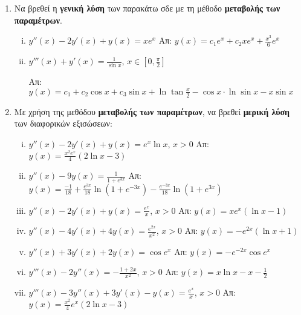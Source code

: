 \documentclass[a4paper,table]{report}
\begin{document}
\begin{enumerate}
  \item Να βρεθεί η \textbf{γενική λύση} των παρακάτω σδε με τη μέθοδο 
    \textbf{μεταβολής των παραμέτρων}.
    \begin{enumerate}[i)]
      \item $y''(x)-2y'(x)+y(x)=xe^{x}$ 
        \hfill Απ: $y(x)=c_{1}e^{x}+c_{2}xe^{x}+\frac{x^{3}}{6}e^{x}$
      \item $y'''(x)+y'(x)=\frac{1}{\sin x}$, $x\in [0,\frac{\pi}{2}]$

        \hfill Απ: $y(x)=c_{1}+c_2\cos x+c_3 \sin x+\ln \tan \frac{x}{2}-
        \cos x\cdot\ln\sin x-x\sin x$
    \end{enumerate}

  \item Με χρήση της μεθόδου \textbf{μεταβολής των παραμέτρων}, να βρεθεί 
    \textbf{μερική λύση} των διαφορικών εξισώσεων:
    \begin{enumerate}[i)]
      \item $y''(x)-2y'(x)+y(x)=e^{x}\ln x$, $x>0$ 
        \hfill Απ: $y(x)=\frac{x^{2}e^{x}}{4}(2\ln x-3)$
      \item $y''(x)-9y(x)=\frac{1}{1+e^{3x}}$ 
        \hfill Απ: $y(x)=\frac{-1}{18}+\frac{e^{3x}}{18}\ln (1+e^{-3x})-
        \frac{e^{-3x}}{18}\ln(1+e^{3x})$
      \item $y''(x)-2y'(x)+y(x)=\frac{e^x}{x}$, $x>0$ \hfill Απ: $y(x)=xe^{x}(\ln x-1)$
      \item $y''(x)-4y'(x)+4y(x)=\frac{e^{2x}}{x^{2}}$, $x>0$ 
        \hfill Απ: $y(x)=-e^{2x}(\ln x +1)$
      \item $y''(x)+3y'(x)+2y(x)=\cos e^{x}$ \hfill Απ: $y(x)=-e^{-2x}\cos e^{x}$
      \item $y'''(x)-2y''(x)=-\frac{1+2x}{x^{2}}$, $x>0$ 
        \hfill Απ: $y(x)=x\ln x-x -\frac{1}{2}$
      \item $y'''(x)-3y''(x)+3y'(x)-y(x)=\frac{e^{x}}{x}$, $x>0$ 
        \hfill Απ: $y(x)=\frac{x^{2}}{4}e^{x}(2\ln x-3)$
    \end{enumerate}


\end{enumerate}
\end{document}
